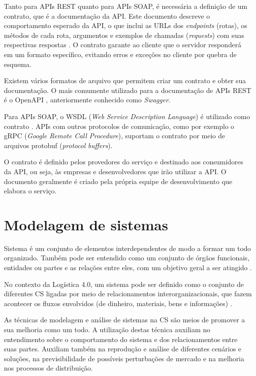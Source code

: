 Tanto para APIs REST quanto para APIs SOAP, é necessária a definição de um contrato, que é a documentação da API. Este documento descreve o comportamento esperado da API, o que inclui as URLs dos \textit{endpoints} (rotas), os métodos de cada rota, argumentos e exemplos de chamadas (\textit{requests}) com suas respectivas respostas \cite{santos2020apicontract}. O contrato garante ao cliente que o servidor responderá em um formato específico, evitando erros e exceções no cliente por quebra de esquema.

Existem vários formatos de arquivo que permitem criar um contrato e obter sua documentação. O mais comumente utilizado para a documentação de APIs REST é o OpenAPI \cite{santos2020openapi}, anteriormente conhecido como \textit{Swagger}.

Para APIs SOAP, o WSDL (\textit{Web Service Description Language}) é utilizado como contrato \cite{booth2004webservice}. APIs com outros protocolos de comunicação, como por exemplo o gRPC (\textit{Google Remote Call Procedure}), suportam o contrato por meio de arquivos protobuf (\textit{protocol buffers}).

O contrato é definido pelos provedores do serviço e destinado aos consumidores da API, ou seja, às empresas e desenvolvedores que irão utilizar a API. O documento geralmente é criado pela própria equipe de desenvolvimento que elabora o serviço.

\section{Modelagem de sistemas}
\label{sec:modelagem-de-sistemas}

Sistema é um conjunto de elementos interdependentes de modo a formar um todo organizado. Também pode ser entendido como um conjunto de órgãos funcionais, entidades ou partes e as relações entre eles, com um objetivo geral a ser atingido \cite{mulbert2005sistemas}.

No contexto da Logística 4.0, um sistema pode ser definido como o conjunto de diferentes CS ligadas por meio de relacionamentos interorganizacionais, que fazem acontecer os fluxos envolvidos (de dinheiro, materiais, bens e informações) \cite{oliveira2016supplychain}.

As técnicas de modelagem e análise de sistemas na CS são meios de promover a sua melhoria como um todo. A utilização destas técnica auxiliam no entendimento sobre o comportamento do sistema e dos relacionamentos entre suas partes. Auxiliam também na reprodução e análise de diferentes cenários e soluções, na previsibilidade de possíveis perturbações de mercado e na melhoria nos processos de distribuição.

